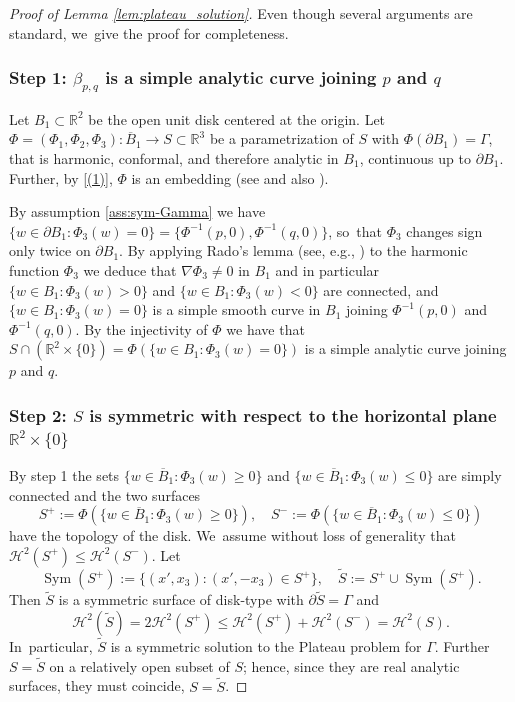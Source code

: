 \documentclass[JEP,XML,SOM,Unicode, NoFloatCountersInSection,published]{cedram}
\DeclareMathOperator{\Sym}{Sym}
\newcommand{\R}{\mathbb{R}}
\theoremstyle{definition}
\begin{document}
\begin{proof}[Proof of Lemma \ref{lem:plateau_solution}]
Even though several arguments are
standard, we~give the proof for completeness.

\subsubsection*{Step 1: $\beta_{p,q}$ is a simple analytic curve joining $p$ and $q$}
Let $B_1\subset\R^2$ be the open unit disk centered at the origin. Let $\Phi=(\Phi_1,\Phi_2,\Phi_3)\colon\overline{B}_1\to S\subset\R^3$
be a parametrization of $S$ with $\Phi(\partial B_1)=\Gamma$,
that is harmonic, conformal, and therefore analytic in $B_1$, continuous up to $\partial B_1$.
Further, by \ref{(1)},
$\Phi$ is an embedding (see \cite{MY} and also \cite[p.\,343]{DHS}).

By assumption \eqref{ass:sym-Gamma} we have $\{w\in\partial B_1\colon\Phi_3(w)=0\}=\{\Phi^{-1}(p,0),\Phi^{-1}(q,0)\}$, so~that $\Phi_3$ changes sign only twice on $\partial B_1$. By applying Rado's lemma (see, e.g., \cite[Lem.\,2, p.\,295]{DHS}) to the harmonic function $\Phi_3$ we deduce that $\nabla\Phi_3\ne0$ in $B_1$ and in particular $\{w\in B_1\colon\Phi_3(w)>0\}$ and $\{w\in B_1\colon\Phi_3(w)<0\}$
are connected, and $\{w\in B_1\colon\Phi_3(w)=0\}$ is a simple smooth curve in $B_1$ joining $\Phi^{-1}(p,0)$ and $\Phi^{-1}(q,0)$.
By the injectivity of $\Phi$ we have that $S\cap(\R^2\times\{0\})=\Phi(\{w\in B_1\colon\Phi_3(w)=0\})$ is a simple analytic curve joining $p$ and $q$.

\subsubsection*{Step 2: $S$ is symmetric with respect to the horizontal plane $\R^2\times\{0\}$}
By step 1 the sets $\{w\in \overline B_1\colon\Phi_3(w)\ge0\}$ and $\{w\in \overline B_1\colon\Phi_3(w)\le0\}$ are simply connected and the two surfaces
\[
S^+:=\Phi(\{w\in \overline B_1\colon\Phi_3(w)\ge0\}),\quad S^-:=\Phi(\{w\in \overline B_1\colon\Phi_3(w)\le0\})
\]
have the topology of the disk. We~assume without loss of generality that $\mathcal{H}^2(S^+)\le \mathcal{H}^2(S^-)$. Let
\[
\Sym(S^+):=\{(x',x_3)\colon (x',-x_3)\in S^+\},\quad \widetilde S:= S^+\cup\Sym(S^+).
\]
Then $\widetilde S$ is a symmetric surface of disk-type with $\partial\widetilde S =\Gamma$ and
\begin{equation*}
\mathcal{H}^2(\widetilde S)=2\mathcal{H}^2(S^+)\le\mathcal{H}^2(S^+)+\mathcal{H}^2(S^-)=\mathcal{H}^2(S).
\end{equation*}
In~particular, $\widetilde S$ is a symmetric solution to the
Plateau problem for $\Gamma$. Further $S=\widetilde S$ on a relatively
open subset of $S$; hence, since they are real
analytic surfaces, they must coincide, $S=\widetilde S$.


\end{proof}
\end{document}
